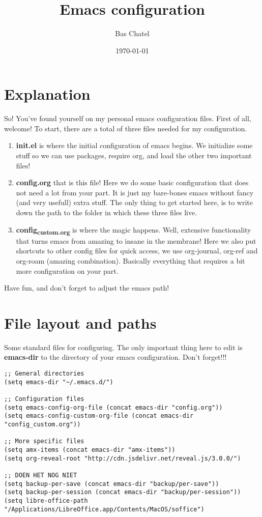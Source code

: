 \documentclass[11pt]{article}
\author{Bas Chatel}
\date{\today}
\title{Emacs configuration}
\begin{document}
\maketitle
\tableofcontents

\section{Explanation}
\label{sec:orgb277a4b}
So! You've found yourself on my personal emacs configuration files. First of all, welcome! To start, there are a total of three files needed for my configuration.

\begin{enumerate}
\item \textbf{init.el} is where the initial configuration of emacs begins. We initialize some stuff so we can use packages, require org, and load the other two important files!
\item \textbf{config.org} that is this file! Here we do some basic configuration that does not need a lot from your part. It is just my bare-bones emacs without fancy (and very usefull) extra stuff. The only thing to get started here, is to write down the path to the folder in which these three files live.
\item \textbf{config\textsubscript{custom.org}} is where the magic happens. Well, extensive functionality that turns emacs from amazing to insane in the membrane! Here we also put shortcuts to other config files for quick access, we use org-journal, org-ref and org-roam (amazing combination). Basically everything that requires a bit more configuration on your part.
\end{enumerate}

Have fun, and don't forget to adjust the emacs path!   
\section{File layout and paths}
\label{sec:orgaa4235f}
Some standard files for configuring. The only important thing here to edit is \textbf{emacs-dir} to the directory of your emacs configuration. Don't forget!!!
\begin{verbatim}
;; General directories
(setq emacs-dir "~/.emacs.d/")

;; Configuration files
(setq emacs-config-org-file (concat emacs-dir "config.org"))
(setq emacs-config-custom-org-file (concat emacs-dir "config_custom.org"))

;; More specific files
(setq amx-items (concat emacs-dir "amx-items"))
(setq org-reveal-root "http://cdn.jsdelivr.net/reveal.js/3.0.0/")

;; DOEN HET NOG NIET
(setq backup-per-save (concat emacs-dir "backup/per-save"))
(setq backup-per-session (concat emacs-dir "backup/per-session"))
(setq libre-office-path "/Applications/LibreOffice.app/Contents/MacOS/soffice")
\end{verbatim}
\end{document}

